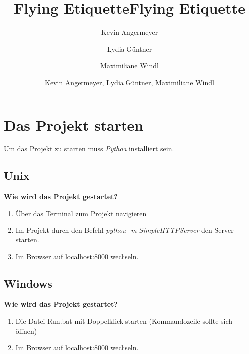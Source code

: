 \documentclass{mi-seminar}
\title{Flying Etiquette}
\author{Kevin Angermeyer \\ \and Lydia Güntner \\ \and Maximiliane Windl}
\title{Flying Etiquette}
\author{Kevin Angermeyer, Lydia Güntner, Maximiliane Windl}
\begin{document}
\maketitle
\newpage
\tableofcontents
\newpage

\section{Das Projekt starten} \label{Das Projekt starten}
Um das Projekt zu starten muss \textit{Python} installiert sein.
\subsection{Unix}
\textbf{Wie wird das Projekt gestartet?}\newline
\begin{enumerate}
\item Über das Terminal zum Projekt navigieren
\item Im Projekt durch den Befehl \textit{python -m SimpleHTTPServer} den Server starten.
\item Im Browser auf localhost:8000 wechseln.
\end{enumerate}
\subsection{Windows}
\textbf{Wie wird das Projekt gestartet?}\newline
\begin{enumerate}
\item Die Datei Run.bat mit Doppelklick starten (Kommandozeile sollte sich öffnen)
\item Im Browser auf localhost:8000 wechseln.
\end{enumerate}
\end{document}
